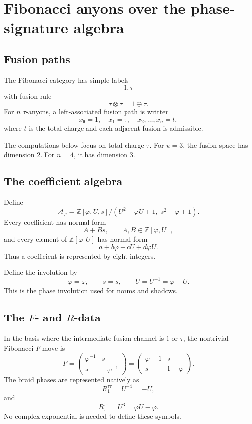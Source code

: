 \documentclass[11pt]{article}
\newcommand{\ph}{\varphi}
\newcommand{\Z}{\mathbb Z}
\newcommand{\A}{\mathcal A}
\begin{document}
\section{Fibonacci anyons over the phase-signature algebra}

\subsection{Fusion paths}

The Fibonacci category has simple labels
\[
    1,\tau
\]
with fusion rule
\[
    \tau\otimes\tau=1\oplus\tau.
\]
For $n$ $\tau$-anyons, a left-associated fusion path is written
\[
    x_0=1,\quad x_1=\tau,\quad x_2,\ldots,x_n=t,
\]
where $t$ is the total charge and each adjacent fusion is admissible.

The computations below focus on total charge $\tau$.  For $n=3$, the fusion space has dimension $2$.  For $n=4$, it has dimension $3$.

\subsection{The coefficient algebra}

Define
\[
    \A_\ph
    =
    \Z[\ph,U,s]/(U^2-\ph U+1,\;s^2-\ph+1).
\]
Every coefficient has normal form
\[
    A+Bs,
    \qquad
    A,B\in\Z[\ph,U],
\]
and every element of $\Z[\ph,U]$ has normal form
\[
    a+b\ph+cU+d\ph U.
\]
Thus a coefficient is represented by eight integers.

Define the involution by
\[
    \bar\ph=\ph,\qquad \bar s=s,\qquad \bar U=U^{-1}=\ph-U.
\]
This is the phase involution used for norms and shadows.

\subsection{The $F$- and $R$-data}

In the basis where the intermediate fusion channel is $1$ or $\tau$, the nontrivial Fibonacci $F$-move is
\[
    F=
    \begin{pmatrix}
    \ph^{-1} & s\\
    s & -\ph^{-1}
    \end{pmatrix}
    =
    \begin{pmatrix}
    \ph-1 & s\\
    s & 1-\ph
    \end{pmatrix}.
\]
The braid phases are represented natively as
\[
    R^{\tau\tau}_1=U^{-4}=-U,
\]
and
\[
    R^{\tau\tau}_{\tau}=U^3=\ph U-\ph.
\]
No complex exponential is needed to define these symbols.
\end{document}
